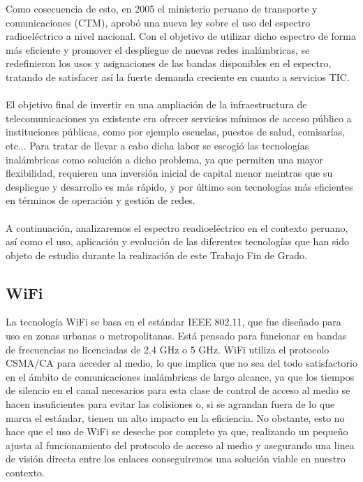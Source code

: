 Como cosecuencia de esto, en 2005 el ministerio peruano de transporte y comunicaciones (CTM), aprobó una nueva ley sobre el uso del espectro radioeléctrico a nivel nacional. Con el objetivo de utilizar dicho espectro de forma más eficiente y promover el despliegue de nuevas redes inalámbricas, se redefinieron los usos y asignaciones de las bandas disponibles en el espectro, tratando de satisfacer así la fuerte demanda creciente en cuanto a servicios TIC. \\\\

El objetivo final de invertir en una ampliación de la infraestructura de telecomunicaciones ya existente era ofrecer servicios mínimos de acceso público a instituciones públicas, como por ejemplo escuelas, puestos de salud, comisarías, etc... Para tratar de llevar a cabo dicha labor se escogió las tecnologías inalámbricas como solución a dicho problema, ya que permiten una mayor flexibilidad, requieren una inversión inicial de capital menor meintras que su despliegue y desarrollo es más rápido, y por último son tecnologías más eficientes en términos de operación y gestión de redes.\\\\

A continuación, analizaremos el espectro readioeléctrico en el contexto peruano, así como el uso, aplicación y evolución de las diferentes tecnologías que han sido objeto de estudio durante la realización de este Trabajo Fin de Grado.

\subsection{WiFi}
La tecnología WiFi se basa en el estándar IEEE 802.11, que fue diseñado para uso en zonas urbanas o metropolitanas. Está pensado para funcionar en bandas de frecuencias no licenciadas de 2.4 GHz o 5 GHz. WiFi utiliza el protocolo CSMA/CA para acceder al medio, lo que implica que no sea del todo satisfactorio en el ámbito de comunicaciones inalámbricas de largo alcance, ya que los tiempos de silencio en el canal necesarios para esta clase de control de acceso al medio se hacen insuficientes para evitar las colisiones o, si se agrandan fuera de lo que marca el estándar, tienen un alto impacto en la eficiencia. No obstante, esto no hace que el uso de WiFi se deseche por completo ya que, realizando un pequeño ajusta al funcionamiento del protocolo de acceso al medio y asegurando una linea de visión directa entre los enlaces conseguiremos una solución viable en nuestro contexto.\\\\
		
